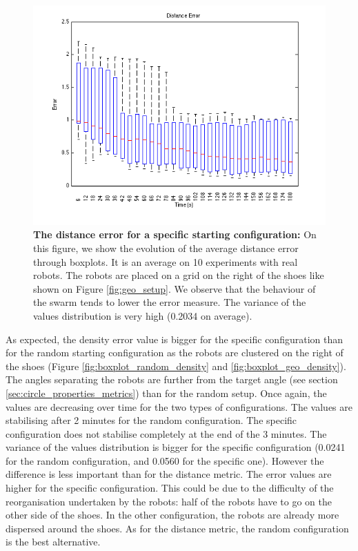 \documentclass[oneside, a4paper, 12pt]{memoir}
\let\oldCaption\caption
\renewcommand{\caption}[2]{
\oldCaption[#1]{{\small\sffamily\bfseries #1:} #2}
}
\begin{document}
				
				\begin{figure}[!htp]
					\includegraphics[width=\textwidth]{../MATLAB/boxplot_geo2_distance.png}
					\caption{The distance error for a specific starting configuration}{On this figure, we show the evolution of the average distance error through boxplots. It is an average on 10 experiments with real robots. The robots are placed on a grid on the right of the shoes like shown on Figure \ref{fig:geo_setup}. We observe that the behaviour of the swarm tends to lower the error measure. The variance of the values distribution is very high (0.2034 on average).}
					\label{fig:boxplot_geo_distance}
				\end{figure}
				
				As expected, the density error value is bigger for the specific configuration than for the random starting configuration as the robots are clustered on the right of the shoes (Figure \ref{fig:boxplot_random_density} and \ref{fig:boxplot_geo_density}). The angles separating the robots are further from the target angle (see section \ref{sec:circle_properties_metrics}) than for the random setup. Once again, the values are decreasing over time for the two types of configurations. The values are stabilising after 2 minutes for the random configuration. The specific configuration does not stabilise completely at the end of the 3 minutes. The variance of the values distribution is bigger for the specific configuration (0.0241 for the random configuration, and 0.0560 for the specific one). However the difference is less important than for the distance metric. The error values are higher for the specific configuration. This could be due to the difficulty of the reorganisation undertaken by the robots: half of the robots have to go on the other side of the shoes. In the other configuration, the robots are already more dispersed around the shoes. As for the distance metric, the random configuration is the best alternative.
				
\end{document}
